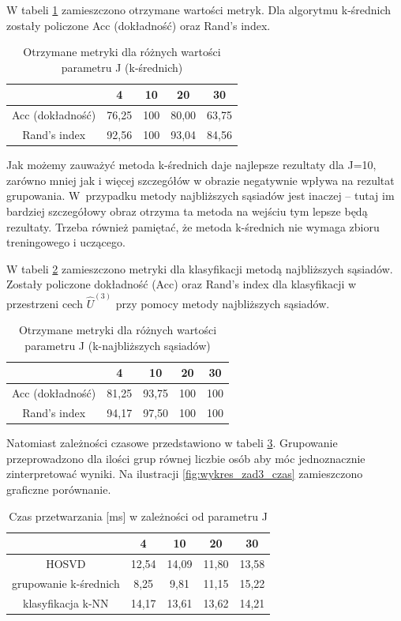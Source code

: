 \documentclass[11pt, a4paper]{article}
\newcommand{\fbi}{\leavevmode{\parindent=1em\indent}}
\begin{document}
\fbi
W tabeli \ref{tab:wynikiKmeans} zamieszczono otrzymane wartości metryk. Dla algorytmu k-średnich zostały policzone Acc (dokładność) oraz Rand's index.

\begin{table}[H]
	\centering
	\caption{Otrzymane metryki dla różnych wartości parametru J (k-średnich)}
	\begin{tabular}{|c|c|c|c|c|}
		\hline 
		 & 4 & 10 & 20 & 30 \\ 
		\hline
		Acc (dokładność) & 76,25 & 100 & 80,00 & 63,75 \\
		\hline
		Rand's index & 92,56 & 100 & 93,04 & 84,56 \\
		\hline
	\end{tabular}
	\label{tab:wynikiKmeans}
\end{table}

\fbi
Jak możemy zauważyć metoda k-średnich daje najlepsze rezultaty dla J=10, zarówno mniej jak i więcej szczegółów w obrazie negatywnie wpływa na rezultat grupowania. W~przypadku metody najbliższych sąsiadów jest inaczej -- tutaj im bardziej szczegółowy obraz otrzyma ta metoda na wejściu tym lepsze będą rezultaty. Trzeba również pamiętać, że metoda k-średnich nie wymaga zbioru treningowego i uczącego.

\fbi
W tabeli \ref{tab:wynikiKnn} zamieszczono metryki dla klasyfikacji metodą najbliższych sąsiadów. Zostały policzone dokładność (Acc) oraz Rand's index dla klasyfikacji w przestrzeni cech $\widehat{U}^{(3)}$ przy pomocy metody najbliższych sąsiadów.

\begin{table}[H]
	\centering
	\caption{Otrzymane metryki dla różnych wartości parametru J (k-najbliższych sąsiadów)}
	\begin{tabular}{|c|c|c|c|c|}
		\hline 
		& 4 & 10 & 20 & 30 \\ 
		\hline
		Acc (dokładność) & 81,25 & 93,75 & 100 & 100 \\
		\hline
		Rand's index & 94,17 & 97,50 & 100 & 100 \\
		\hline
	\end{tabular}
	\label{tab:wynikiKnn}
\end{table}

\fbi
Natomiast zależności czasowe przedstawiono w tabeli \ref{tab:wynikiCzas}. Grupowanie przeprowadzono dla ilości grup równej liczbie osób aby móc jednoznacznie zinterpretować wyniki. Na ilustracji \ref{fig:wykres_zad3_czas} zamieszczono graficzne porównanie.

\begin{table}[H]
	\centering
	\caption{Czas przetwarzania [ms] w zależności od parametru J}
	\begin{tabular}{|c|c|c|c|c|}
		\hline 
		& 4 & 10 & 20 & 30 \\ 
		\hline
		HOSVD & 12,54 & 14,09 & 11,80 & 13,58 \\
		\hline
		grupowanie k-średnich & 8,25 & 9,81 & 11,15 & 15,22 \\
		\hline
		klasyfikacja k-NN & 14,17 & 13,61 & 13,62 & 14,21 \\
		\hline
	\end{tabular}
	\label{tab:wynikiCzas}
\end{table}
\end{document}
